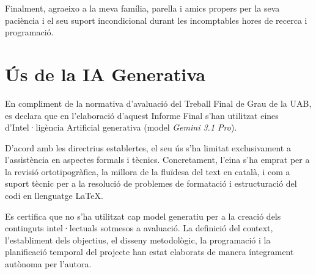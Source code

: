 \documentclass[10pt,a4paper,twocolumn,twoside]{article}
\begin{document}
Finalment, agraeixo a la meva família, parella i amics propers per la seva paciència i el seu suport incondicional durant les incomptables hores de recerca i programació. 

\section*{Ús de la IA Generativa}
En compliment de la normativa d'avaluació del Treball Final de Grau de la UAB, es declara que en l'elaboració d'aquest Informe Final s'han utilitzat eines d'Intel·ligència Artificial generativa (model \textit{Gemini 3.1 Pro}). 

D'acord amb les directrius establertes, el seu ús s'ha limitat exclusivament a l'assistència en aspectes formals i tècnics. Concretament, l'eina s'ha emprat per a la revisió ortotipogràfica, la millora de la fluïdesa del text en català, i com a suport tècnic per a la resolució de problemes de formatació i estructuració del codi en llenguatge \LaTeX.

Es certifica que no s'ha utilitzat cap model generatiu per a la creació dels continguts intel·lectuals sotmesos a avaluació. La definició del context, l'establiment dels objectius, el disseny metodològic, la programació i la planificació temporal del projecte han estat elaborats de manera íntegrament autònoma per l'autora.
\end{document}
